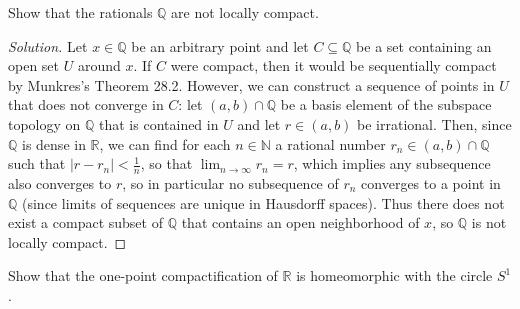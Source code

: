\documentclass[10pt]{article}
\providecommand{\NN}{\mathbb N}
\providecommand{\QQ}{\mathbb Q}
\providecommand{\RR}{\mathbb R}
\newenvironment{soln}{\begin{proof}[Solution]}{\end{proof}}
\providecommand{\abs}[1]{\left|#1\right|}
\begin{document}
\pagebreak 
\begin{problem}
    [Munkres 29.1]
    Show that the rationals $\QQ$ are not locally compact.
\end{problem}

\begin{soln}
    Let $x\in\QQ$ be an arbitrary point
    and let $C\subseteq\QQ$ be a set containing an open set $U$ around $x$.
    If $C$ were compact, then it would be sequentially compact
    by Munkres's Theorem 28.2. However, we can construct a sequence
    of points in $U$ that does not converge in $C$:
    let $(a,b)\cap\QQ$ be a basis element of the subspace topology on $\QQ$
    that is contained in $U$ and let $r\in (a,b)$ be irrational.
    Then, since $\QQ$ is dense in $\RR$, we can find for each $n\in\NN$
    a rational number $r_n\in (a,b)\cap\QQ$ such that $\abs{r - r_n} < \frac 1n$,
    so that $\lim_{n\to\infty}r_n = r$, which implies any subsequence
    also converges to $r$, so in particular no subsequence of $r_n$
    converges to a point in $\QQ$ (since limits of sequences are unique
    in Hausdorff spaces). Thus there does not exist
    a compact subset of $\QQ$ that contains an open neighborhood of $x$,
    so $\QQ$ is not locally compact.
\end{soln}

\begin{problem}
    Show that the one-point compactification of $\RR$
    is homeomorphic with the circle $S^1$.
\end{problem}
\end{document}
